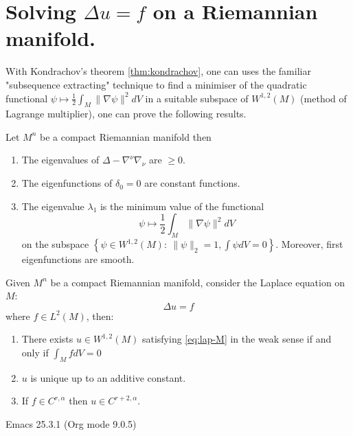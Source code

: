 \documentclass[11pt]{article}
\begin{document}
\section{Solving \(\Delta u = f\) on a Riemannian manifold.}
\label{sec:org8cc1a23}
With Kondrachov's theorem \ref{thm:kondrachov}, one can uses the familiar "subsequence
extracting" technique to find a minimiser of the quadratic functional
\(\psi \mapsto \frac{1}{2}\int_M \|\nabla\psi\|^2 dV\) in a suitable subspace of
\(W^{1,2}(M)\) (method of Lagrange multiplier), one can prove the following results.

\begin{theorem}
\label{thm:spec-lap}
Let \(M^n\) be a compact Riemannian manifold then
\begin{enumerate}
\item The eigenvalues of \(\Delta - \nabla^\nu\nabla_\nu\) are \(\geq 0\).
\item The eigenfunctions of \(\delta_0=0\) are constant functions.
\item The eigenvalue \(\lambda_1\) is the minimum value of the functional
\[
    \psi \mapsto \frac{1}{2}\int_M \|\nabla\psi\|^2 dV
   \]
 on the subspace \(\left\{\psi \in W^{1,2}(M): \ \|\psi\|_2 = 1,\int\psi dV=0 \right\}\).
Moreover, first eigenfunctions are smooth.
\end{enumerate}
\end{theorem}


\begin{theorem}
\label{thm:lap-l2}
Given \(M^n\) be a compact Riemannian manifold, consider the Laplace equation on \(M\):
\begin{equation}
\label{eq:lap-M}
\Delta u = f	
\end{equation}
where \(f\in L^2(M)\), then:
\begin{enumerate}
\item There exists \(u\in W^{1,2}(M)\) satisfying \eqref{eq:lap-M} in the weak sense if and only if \(\int_M f
   dV = 0\)
\item \(u\) is unique up to an additive constant.
\item If \(f\in C^{r,\alpha}\) then \(u\in C^{r+2,\alpha}\).
\end{enumerate}
\end{theorem}





Emacs 25.3.1 (Org mode 9.0.5)
\end{document}
